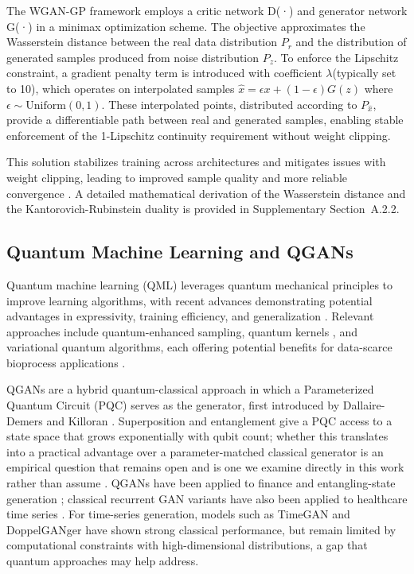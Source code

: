 \documentclass[12pt,twocolumn]{article}
\begin{document}
The WGAN-GP framework employs a critic network D(·) and generator network G(·) in a minimax optimization scheme. The objective approximates the Wasserstein distance between the real data distribution $P_r$ and the distribution of generated samples produced from noise distribution $P_z$. To enforce the Lipschitz constraint, a gradient penalty term is introduced with coefficient $\lambda $(typically set to 10), which operates on interpolated samples $\hat{x} = \epsilon x + (1-\epsilon)G(z)$ where $\epsilon \sim \text{Uniform}(0,1)$. These interpolated points, distributed according to $P_{\hat{x}}$, provide a differentiable path between real and generated samples, enabling stable enforcement of the 1-Lipschitz continuity requirement without weight clipping.

This solution stabilizes training across architectures and mitigates issues with weight clipping, leading to improved sample quality and more reliable convergence \cite{villani2008optimal}. A detailed mathematical derivation of the Wasserstein distance and the Kantorovich-Rubinstein duality is provided in Supplementary Section~A.2.2.

\subsection{Quantum Machine Learning and QGANs}

Quantum machine learning (QML) leverages quantum mechanical principles to improve learning algorithms, with recent advances demonstrating potential advantages in expressivity, training efficiency, and generalization \cite{Biamonte2017, kashyap2025advancesmachinelearningquantum}. Relevant approaches include quantum-enhanced sampling, quantum kernels \cite{havlicek2019supervised, schuld2019quantum}, and variational quantum algorithms, each offering potential benefits for data-scarce bioprocess applications \cite{Cerezo_2021}.


QGANs are a hybrid quantum-classical approach in which a Parameterized Quantum Circuit (PQC) serves as the generator, first introduced by Dallaire-Demers and Killoran \cite{Dallaire_Demers_2018}. Superposition and entanglement give a PQC access to a state space that grows exponentially with qubit count; whether this translates into a practical advantage over a parameter-matched classical generator is an empirical question that remains open and is one we examine directly in this work rather than assume \cite{rudolph2022generationhighresolutionhandwrittendigits}. QGANs have been applied to finance \cite{orlandi2024enhancing} and entangling-state generation \cite{niu2022entangling}; classical recurrent GAN variants have also been applied to healthcare time series \cite{esteban2017realvaluedmedicaltimeseries}. For time-series generation, models such as TimeGAN \cite{yoon2019TimeGAN} and DoppelGANger \cite{Lin_2020} have shown strong classical performance, but remain limited by computational constraints with high-dimensional distributions, a gap that quantum approaches may help address.
\end{document}
